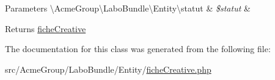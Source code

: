 \begin{DoxyParams}[1]{Parameters}
\textbackslash{}\+Acme\+Group\textbackslash{}\+Labo\+Bundle\textbackslash{}\+Entity\textbackslash{}statut & {\em \$statut} & \\
\hline
\end{DoxyParams}
\begin{DoxyReturn}{Returns}
\hyperlink{class_acme_group_1_1_labo_bundle_1_1_entity_1_1fiche_creative}{fiche\+Creative} 
\end{DoxyReturn}


The documentation for this class was generated from the following file\+:\begin{DoxyCompactItemize}
\item 
src/\+Acme\+Group/\+Labo\+Bundle/\+Entity/\hyperlink{fiche_creative_8php}{fiche\+Creative.\+php}\end{DoxyCompactItemize}
